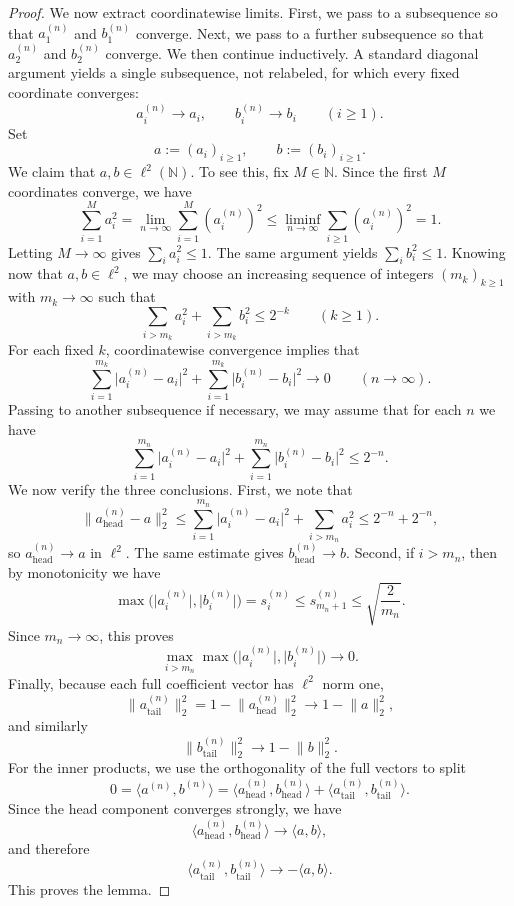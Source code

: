 \documentclass[11pt]{amsart}
\numberwithin{equation}{section}
\theoremstyle{definition}
\theoremstyle{remark}
\newcommand{\N}{\mathbb N}
\newcommand{\abs}[1]{\lvert #1 \rvert}
\newcommand{\norm}[1]{\lVert #1 \rVert}
\newcommand{\ip}[2]{\langle #1,#2\rangle}
\begin{document}
\begin{proof}
We now extract coordinatewise limits.  First, we pass to a subsequence so that
$a_1^{(n)}$ and $b_1^{(n)}$ converge.  Next, we pass to a further subsequence so
that $a_2^{(n)}$ and $b_2^{(n)}$ converge. We then continue inductively.  A
standard diagonal argument yields a single subsequence, not relabeled, for
which every fixed coordinate converges:
\[
a_i^{(n)}\to a_i,
\qquad
b_i^{(n)}\to b_i
\qquad(i\ge1).
\]
Set
\[
a:=(a_i)_{i\ge1},
\qquad
b:=(b_i)_{i\ge1}.
\]
We claim that $a,b\in\ell^2(\N)$.  To see this, fix $M\in\N$.  Since the first $M$
coordinates converge, we have
\[
\sum_{i=1}^{M} a_i^2
=\lim_{n\to\infty}\sum_{i=1}^{M}(a_i^{(n)})^2
\le \liminf_{n\to\infty}\sum_{i\ge1}(a_i^{(n)})^2
=1.
\]
Letting $M\to\infty$ gives
$\sum_i a_i^2\le1$.  The same argument yields $\sum_i b_i^2\le1$.
Knowing now that $a,b\in\ell^2$, we may choose an increasing sequence of integers
$(m_k)_{k\ge1}$ with $m_k\to\infty$ such that
\[
\sum_{i>m_k} a_i^2+\sum_{i>m_k} b_i^2\le 2^{-k}
\qquad(k\ge1).
\]
For each fixed $k$, coordinatewise convergence implies that
\[
\sum_{i=1}^{m_k}\abs{a_i^{(n)}-a_i}^2
+
\sum_{i=1}^{m_k}\abs{b_i^{(n)}-b_i}^2
\longrightarrow0
\qquad(n\to\infty).
\]
Passing to another subsequence if necessary, we may assume that for each $n$ we have
\[
\sum_{i=1}^{m_n}\abs{a_i^{(n)}-a_i}^2
+
\sum_{i=1}^{m_n}\abs{b_i^{(n)}-b_i}^2
\le 2^{-n}.
\]
We now verify the three conclusions.  First, we note that
\[
\norm{a_{\mathrm{head}}^{(n)}-a}_2^2
\le
\sum_{i=1}^{m_n}\abs{a_i^{(n)}-a_i}^2
+
\sum_{i>m_n}a_i^2
\le 2^{-n}+2^{-n},
\]
so $a_{\mathrm{head}}^{(n)}\to a$ in $\ell^2$.  The same estimate gives
$b_{\mathrm{head}}^{(n)}\to b$.
Second, if $i>m_n$, then by monotonicity we have
\[
\max\bigl(\abs{a_i^{(n)}},\abs{b_i^{(n)}}\bigr)
=s_i^{(n)}
\le s_{m_n+1}^{(n)}
\le \sqrt{\frac{2}{m_n}}.
\]
Since $m_n\to\infty$, this proves
\[
\max_{i>m_n}\max\bigl(\abs{a_i^{(n)}},\abs{b_i^{(n)}}\bigr)\to0.
\]
Finally, because each full coefficient vector has $\ell^2$ norm one,
\[
\norm{a_{\mathrm{tail}}^{(n)}}_2^2
=1-\norm{a_{\mathrm{head}}^{(n)}}_2^2
\longrightarrow 1-\norm{a}_2^2,
\]
and similarly
\[
\norm{b_{\mathrm{tail}}^{(n)}}_2^2
\longrightarrow 1-\norm{b}_2^2.
\]
For the inner products, we use the orthogonality of the full vectors to split
\[
0
=\ip{a^{(n)}}{b^{(n)}}
=\ip{a_{\mathrm{head}}^{(n)}}{b_{\mathrm{head}}^{(n)}}
+\ip{a_{\mathrm{tail}}^{(n)}}{b_{\mathrm{tail}}^{(n)}}.
\]
Since the head component converges strongly, we have
\[
\ip{a_{\mathrm{head}}^{(n)}}{b_{\mathrm{head}}^{(n)}}
\to \ip{a}{b},
\]
and therefore
\[
\ip{a_{\mathrm{tail}}^{(n)}}{b_{\mathrm{tail}}^{(n)}}
\to -\ip{a}{b}.
\]
This proves the lemma.
\end{proof}
\end{document}
